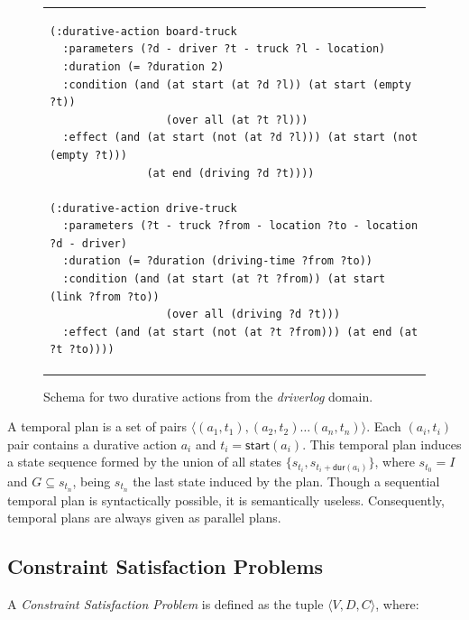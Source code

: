 \documentclass[runningheads]{llncs}
\newcommand{\tup}[1]{{\langle #1 \rangle}}
\newcommand{\dur}{\mathsf{dur}}    %
\newcommand{\start}{\mathsf{start}}%
\newcommand{\til}{\mathsf{til}}    %
\begin{document}
\begin{figure}
\begin{tabular}{p{\textwidth}}
\begin{verbatim}
(:durative-action board-truck
  :parameters (?d - driver ?t - truck ?l - location)
  :duration (= ?duration 2)
  :condition (and (at start (at ?d ?l)) (at start (empty ?t))
                  (over all (at ?t ?l)))
  :effect (and (at start (not (at ?d ?l))) (at start (not (empty ?t)))
               (at end (driving ?d ?t))))

(:durative-action drive-truck
  :parameters (?t - truck ?from - location ?to - location ?d - driver)
  :duration (= ?duration (driving-time ?from ?to))
  :condition (and (at start (at ?t ?from)) (at start (link ?from ?to))
                  (over all (driving ?d ?t)))
  :effect (and (at start (not (at ?t ?from))) (at end (at ?t ?to))))
\end{verbatim}
\end{tabular}
\caption{\small Schema for two durative actions from the {\em driverlog} domain.}
\label{fig:exampleactions2}
\end{figure}





A temporal plan is a set of pairs $\tup{(a_1,t_1),(a_2,t_2)\ldots (a_n,t_n)}$. Each $(a_i,t_i)$ pair contains a durative action $a_i$ and $t_i=\start(a_i)$.
This temporal plan induces a state sequence formed by the union of all states $\{s_{t_i}, s_{t_i+\dur(a_i)}\}$, where $s_{t_0}=I$ and $G\subseteq s_{t_n}$, being $s_{t_n}$ the last state induced by the plan.
Though a sequential temporal plan is syntactically possible, it is semantically useless. Consequently, temporal plans are always given as parallel plans.


\subsection{Constraint Satisfaction Problems}
\label{sec:csp}

A {\em Constraint Satisfaction Problem} is defined as the tuple $\tup{V,D,C}$, where:
\end{document}
